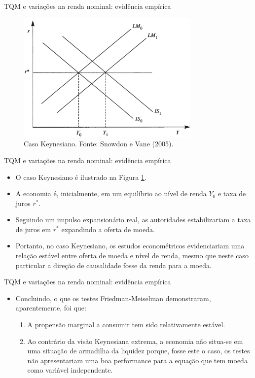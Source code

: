 \documentclass[10pt]{beamer}
\begin{document}
\begin{frame}{TQM e variações na renda nominal: evidência empírica}
    \begin{figure}
        \centering
        \includegraphics[width=0.8\textwidth]{./figures/aula10_fig7.PNG}
        \caption{Caso Keynesiano. Fonte: Snowdon e Vane (2005).}
        \label{fig7}
    \end{figure}
\end{frame}

\begin{frame}{TQM e variações na renda nominal: evidência empírica}
    \begin{itemize}
        \item O caso Keynesiano é ilustrado na Figura \ref{fig7}.
        \bigskip
        \item A economia é, inicialmente, em um equilíbrio ao nível de renda $Y_0$ e taxa de juros $r^*$.
        \bigskip
        \item Seguindo um impulso expansionário real, as autoridades estabilizariam a taxa de juros em $r^*$ expandindo a oferta de moeda.
        \bigskip
        \item Portanto, no caso Keynesiano, os estudos econométricos evidenciariam uma relação estável entre oferta de moeda e nível de renda, mesmo que neste caso particular a direção de causalidade fosse da renda para a moeda.
    \end{itemize}
\end{frame}

\begin{frame}{TQM e variações na renda nominal: evidência empírica}
    \begin{itemize}
        \item Concluindo, o que os testes Friedman-Meiselman demonstraram, aparentemente, foi que:
        \bigskip
        \begin{enumerate}
            \item A propensão marginal a consumir tem sido relativamente estável.
            \bigskip
            \item Ao contrário da visão Keynesiana extrema, a economia não situa-se em uma situação de armadilha da liquidez porque, fosse este o caso, os testes não apresentariam uma boa performance para a equação que tem moeda como variável independente.
        \end{enumerate}
    \end{itemize}
\end{frame}
\end{document}
